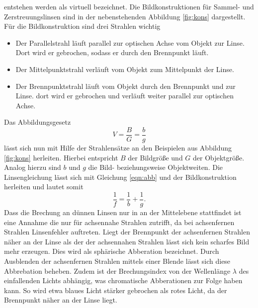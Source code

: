 entstehen werden als virtuell bezeichnet. Die Bildkonstruktionen für Sammel- und
Zerstreuungslinsen sind in der nebenstehenden Abbildung \ref{fig:kons} dargestellt.
Für die Bildkonstruktion sind drei Strahlen wichtig
\begin{itemize}
  \item Der Parallelstrahl läuft parallel zur optischen Achse vom Objekt zur Linse. Dort wird er gebrochen, sodass er durch den Brennpunkt läuft.
  \item Der Mittelpunktstrahl verläuft vom Objekt zum Mittelpunkt der Linse.
  \item Der Brennpunktstrahl läuft vom Objekt durch den Brennpunkt und zur Linse.
  dort wird er gebrochen und verläuft weiter parallel zur optischen Achse.
\end{itemize}
Das Abbildungsgesetz
\begin{equation}
  V = \frac{B}{G} = \frac{b}{g}
  \label{eqn:abb}
\end{equation}
lässt sich nun mit Hilfe der Strahlensätze an den Beispielen aus Abbildung \ref{fig:kons}
herleiten. Hierbei entspricht $B$ der Bildgröße und $G$ der Objektgröße. Analog
hierzu sind $b$ und $g$ die Bild- beziehungsweise Objektweiten. Die Linsengleichung
lässt sich mit Gleichung \eqref{eqn:abb} und der Bildkonstruktion herleiten und
lautet somit
\begin{equation}
  \frac{1}{f}=\frac{1}{b}+\frac{1}{g}.
\end{equation}
Dass die Brechung an dünnen Linsen nur in an der Mittelebene stattfindet ist eine
Annahme die nur für achsennahe Strahlen zutrifft, da bei achsenfernen Strahlen
Linsenfehler auftreten. Liegt der Brennpunkt der achsenfernen Strahlen näher an
der Linse als der der achsennahen Strahlen lässt sich kein scharfes Bild mehr erzeugen.
Dies wird als sphärische Abberation bezeichnet. Durch Ausblenden der
achsenfernen Strahlen mittels einer Blende lässt sich diese Abbrebation beheben.
Zudem ist der Brechungsindex von der Wellenlänge $\lambda$ des einfallenden Lichts
abhängig, was chromatische Abberationen zur Folge haben kann.
So wird etwa blaues Licht stärker gebrochen als rotes Licht, da der Brennpunkt
näher an der Linse liegt.

